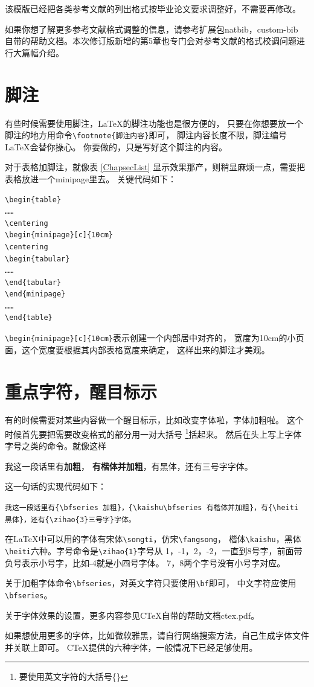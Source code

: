 该模版已经把各类参考文献的列出格式按毕业论文要求调整好，不需要再修改。

如果你想了解更多参考文献格式调整的信息，请参考扩展包natbib，custom-bib
自带的帮助文档。本次修订版新增的第5章也专门会对参考文献的格式校调问题进行大篇幅介绍。

\section{脚注}

有些时候需要使用脚注，\LaTeX 的脚注功能也是很方便的，
只要在你想要放一个脚注的地方用命令\verb+\footnote{脚注内容}+即可，
脚注内容长度不限，脚注编号\LaTeX 会替你操心。
你要做的，只是写好这个脚注的内容。

对于表格加脚注，就像表 \ref{ChapsecList} 显示效果那产，则稍显麻烦一点，需要把表格放进一个minipage里去。
关键代码如下：

{
\linespread{1}
\noindent
\begin{verbatim}
\begin{table}
……
\centering
\begin{minipage}[c]{10cm}
\centering
\begin{tabular}
……
\end{tabular}
\end{minipage}
……
\end{table}
\end{verbatim}
}

\verb+\begin{minipage}[c]{10cm}+表示创建一个内部居中对齐的，
宽度为10cm的小页面，这个宽度要根据其内部表格宽度来确定，
这样出来的脚注才美观。

\section{重点字符，醒目标示}

有的时候需要对某些内容做一个醒目标示，比如改变字体啦，字体加粗啦。
这个时候首先要把需要改变格式的部分用一对大括号
\footnote{要使用英文字符的大括号\{\}}括起来。
然后在头上写上字体字号之类的命令。就像这样

我这一段话里有{\bfseries 加粗}，
{\kaishu\bfseries 有楷体并加粗}，有{\heiti 黑体}，还有{三号字}字体。

这一句话的实现代码如下：

{
\linespread{1}
\noindent
\verb+我这一段话里有{\bfseries 加粗}，{\kaishu\bfseries 有楷体并加粗}，有{\heiti 黑体}，还有{\zihao{3}三号字}字体。+
}

在\LaTeX 中可以用的字体有{\songti 宋体}\verb+\songti+，{\fangsong 仿宋}\verb+\fangsong+，
{\kaishu 楷体}\verb+\kaishu+，{\heiti 黑体}\verb+\heiti+六种。字号命令是\verb+\zihao{1}+字号从
1，-1，2，-2，一直到8号字，前面带负号表示小号字，比如-4就是小四号字体。
7，8两个字号没有小号字对应。

关于加粗字体命令\verb+\bfseries+，对英文字符只要使用\verb+\bf+即可，
中文字符应使用\verb+\bfseries+。

关于字体效果的设置，更多内容参见CTeX自带的帮助文档ctex.pdf。

如果想使用更多的字体，比如微软雅黑，请自行网络搜索方法，自己生成字体文件并关联上即可。
CTeX提供的六种字体，一般情况下已经足够使用。


